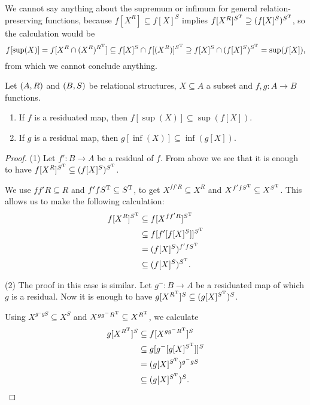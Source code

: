 We cannot say anything about the supremum or infimum for general relation-preserving functions, because $f[X^R] \subseteq f[X]^S$ implies $f[X^R]^{S^{\mathrm{T}}} \supseteq (f[X]^S)^{S^{\mathrm{T}}}$, so the calculation would be
\[ f[\sup(X)] = f[X^R\cap (X^R)^{R^{\mathrm{T}}}] \subseteq f[X]^S \cap f[(X^R)]^{S^{\mathrm{T}}} \supseteq f[X]^S \cap (f[X]^S)^{S^{\mathrm{T}}} = \sup(f[X]), \]
from which we cannot conclude anything.

\begin{proposition} \label{residuationPreservesSupInf}
Let $\sSet{A, R}$ and $\sSet{B, S}$ be relational structures, $X\subseteq A$ a subset and $f,g : A\to B$ functions.
\begin{enumerate}
\item If $f$ is a residuated map, then $f[\sup(X)] \subseteq \sup(f[X])$.
\item If $g$ is a residual map, then $g[\inf(X)] \subseteq \inf(g[X])$.
\end{enumerate}
\end{proposition}
\begin{proof}
(1) Let $f': B\to A$ be a residual of $f$. From above we see that it is enough to have $f[X^R]^{S^{\mathrm{T}}} \subseteq (f[X]^S)^{S^{\mathrm{T}}}$.

We use $ff'R \subseteq R$ and $f'fS^{\mathrm{T}} \subseteq S^{\mathrm{T}}$, to get $X^{ff'R} \subseteq X^{R}$ and $X^{f'fS^{\mathrm{T}}} \subseteq X^{S^{\mathrm{T}}}$. This allows us to make the following calculation:
\begin{align*}
f[X^R]^{S^{\mathrm{T}}} &\subseteq f[X^{ff'R}]^{S^{\mathrm{T}}} \\
&\subseteq f[f'[f[X]^S]]^{S^{\mathrm{T}}} \\
&= (f[X]^S)^{f'fS^{\mathrm{T}}} \\
&\subseteq (f[X]^S)^{S^{\mathrm{T}}}.
\end{align*}

(2) The proof in this case is similar. Let $g^-: B\to A$ be a residuated map of which $g$ is a residual. Now it is enough to have $g[X^{R^{\mathrm{T}}}]^{S} \subseteq (g[X]^{S^{\mathrm{T}}})^{S}$.

Using $X^{g^-gS}\subseteq X^S$ and $X^{gg^-R^{\mathrm{T}}} \subseteq X^{R^{\mathrm{T}}}$, we calculate
\begin{align*}
g[X^{R^{\mathrm{T}}}]^{S} &\subseteq f[X^{gg^-R^{\mathrm{T}}}]^{S} \\
&\subseteq g[g^-[g[X]^{S^{\mathrm{T}}}]]^{S} \\
&= (g[X]^{S^{\mathrm{T}}})^{g^-gS} \\
&\subseteq (g[X]^{S^{\mathrm{T}}})^{S}.
\end{align*}
\end{proof}


